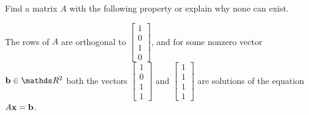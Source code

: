 \begin{problem}{\problemnum}
Find a matrix $A$ with the following property or explain why none can exist.

The rows of $A$ are orthogonal to $\begin{bmatrix}1\\0\\1\\0\end{bmatrix}$, and for some nonzero vector $\bb \in \bbR^2$ both the vectors $\begin{bmatrix}1\\0\\1\\1\end{bmatrix}$ and $\begin{bmatrix}1\\1\\1\\1\end{bmatrix}$ are solutions of the equation $A\mathbf{x}=\mathbf{b}$.
\end{problem}
